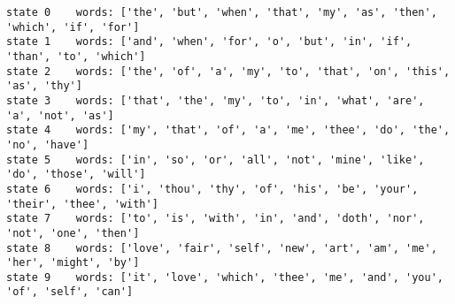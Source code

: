 \begin{lstlisting}[mathescape]
state 0    words: ['the', 'but', 'when', 'that', 'my', 'as', 'then', 'which', 'if', 'for']
state 1    words: ['and', 'when', 'for', 'o', 'but', 'in', 'if', 'than', 'to', 'which']
state 2    words: ['the', 'of', 'a', 'my', 'to', 'that', 'on', 'this', 'as', 'thy']
state 3    words: ['that', 'the', 'my', 'to', 'in', 'what', 'are', 'a', 'not', 'as']
state 4    words: ['my', 'that', 'of', 'a', 'me', 'thee', 'do', 'the', 'no', 'have']
state 5    words: ['in', 'so', 'or', 'all', 'not', 'mine', 'like', 'do', 'those', 'will']
state 6    words: ['i', 'thou', 'thy', 'of', 'his', 'be', 'your', 'their', 'thee', 'with']
state 7    words: ['to', 'is', 'with', 'in', 'and', 'doth', 'nor', 'not', 'one', 'then']
state 8    words: ['love', 'fair', 'self', 'new', 'art', 'am', 'me', 'her', 'might', 'by']
state 9    words: ['it', 'love', 'which', 'thee', 'me', 'and', 'you', 'of', 'self', 'can']
\end{lstlisting}

